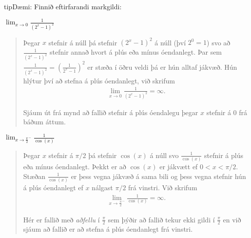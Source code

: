 \documentclass[a4paper,10pt,icelandic]{sphinxmanual}
\begin{document}
\begin{sphinxadmonition}{tip}{Dæmi:}
Finnið eftirfarandi markgildi:


 \(\lim_{x\to 0}\frac{1}{(2^x-1)^2}\)
\begin{quote}

Þegar \(x\) stefnir á núll þá stefnir \((2^x-1)^2\) á núll (því \(2^0=1\)) svo að
\(\frac{1}{(2^x-1)^2}\) stefnir annað hvort á plús eða mínus óendanlegt. Þar sem  \(\frac{1}{(2^x-1)^2}=\left(\frac{1}{2^x-1}\right)^2\) er stæða í öðru veldi þá er hún alltaf jákvæð. Hún hlýtur því að stefna á plús óendanlegt, við skrifum
\begin{equation*}
\begin{split}\lim_{x\to 0}\frac{1}{(2^x-1)^2}=\infty.\end{split}
\end{equation*}
\begin{figure}[H]
\centering

\noindent{}
\end{figure}

Sjáum út frá mynd að fallið stefnir á plús óendalegu þegar \(x\) stefnir á \(0\) frá báðum áttum.
\end{quote}

 \(\lim_{x\to \frac{\pi}{2}^-}\frac{1}{\cos(x)}\)
\begin{quote}

Þegar \(x\) stefnir á \(\pi/2\) þá stefnir \(\cos(x)\) á núll svo \(\frac{1}{\cos(x)}\) stefnir á plús eða mínus óendanlegt.
Þekkt er að \(\cos(x)\) er jákvætt ef \(0<x<\pi/2\). Stæðan \(\frac{1}{\cos(x)}\) er þess vegna jákvæð á sama bili og þess vegna stefnir hún á plús óendanlegt ef \(x\) nálgast \(\pi/2\) frá vinstri.
Við skrifum
\begin{equation*}
\begin{split}\lim_{x\to \frac{\pi}{2}^{-}}\frac{1}{\cos(x)}=\infty.\end{split}
\end{equation*}
\begin{figure}[H]
\centering

\noindent{}
\end{figure}

Hér er fallið með \textit{aðfellu} í \(\frac{\pi}{2}\) sem þýðir að fallið tekur ekki gildi í \(\frac{\pi}{2}\) en við sjáum að fallið er að stefna á plús óendanlegt frá vinstri.
\end{quote}
\end{sphinxadmonition}
\end{document}
